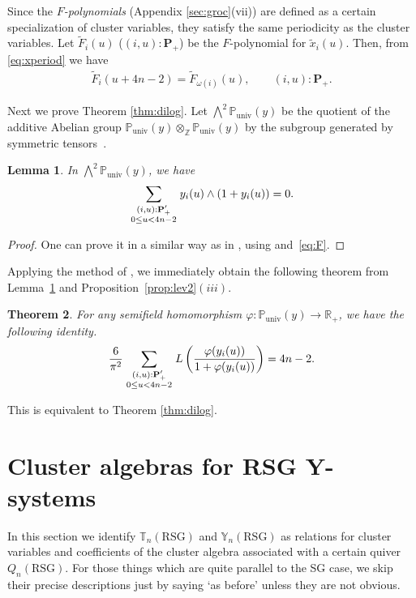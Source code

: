 \documentclass[pdftex]{sigma}
\numberwithin{equation}{section}
\newtheorem{Theorem}{Theorem}[section]
\newtheorem{Lemma}[Theorem]{Lemma}
\theoremstyle{definition}
\begin{document}
Since the {\em $F$-polynomials\/}
(Appendix \ref{sec:groc}(vii))
are def\/ined as a certain specialization of cluster variables,
they satisfy the same periodicity as the cluster variables.
Let $\tilde{F}_i(u)$ ($(i,u):\mathbf{P}_+$) be the $F$-polynomial
for $\tilde{x}_i(u)$.
Then, from \eqref{eq:xperiod} we have
\begin{gather}
\label{eq:F}
\tilde{F}_i(u+4n-2)=\tilde{F}_{\omega(i)}(u),
\qquad (i,u):\mathbf{P}_+.
\end{gather}

Next we prove
Theorem \ref{thm:dilog}.
Let $\bigwedge^2 \mathbb{P}_{\mathrm{univ}}(y)$
be the quotient of
the additive Abelian  group
$\mathbb{P}_{\mathrm{univ}}(y)\otimes_{\mathbb{Z}}
\mathbb{P}_{\mathrm{univ}}(y)$
by the subgroup generated by
symmetric tensors~\cite{Frenkel95,Chapoton05}.
\begin{Lemma}
\label{lem:dilog}
In $\bigwedge^2 \mathbb{P}_{\mathrm{univ}}(y)$, we have
\[
\sum_{
\genfrac{}{}{0pt}{1}
{
(i,u):\mathbf{P}'_+
}
{
0\leq u < 4n-2
}
} y_i(u)\wedge (1+y_i(u))=0.
\]
\end{Lemma}
\begin{proof}
One can prove it in a similar way as in \cite{Nakanishi09,Inoue10a},
using \cite[Proposition 3.13]{Fomin07} and~\eqref{eq:F}.$\!\!\!\!\!$
\end{proof}

Applying the method of \cite{Frenkel95,Chapoton05,Nakanishi09},
we immediately obtain the following theorem from
Lemma~\ref{lem:dilog} and Proposition~\ref{prop:lev2}$(iii)$.

\begin{Theorem}
For any semifield homomorphism $\varphi:\mathbb{P}_{\mathrm{univ}}(y)
\rightarrow \mathbb{R}_+$, we have the following identity.
\begin{gather*}
\frac{6}{\pi^2}
\sum_{
\genfrac{}{}{0pt}{1}
{
(i,u):\mathbf{P}'_+
}
{
0\leq u < 4n-2
}
}
L\left(
\frac{\varphi(y_i(u))}{1+\varphi(y_i(u))}
\right)
 =4n-2.
\end{gather*}
\end{Theorem}
This is equivalent to Theorem \ref{thm:dilog}.

\section{Cluster algebras for RSG Y-systems}
\label{sec:clusterRSG}

In this section we identify $\mathbb{T}_{n}(\mathrm{RSG})$ and
$\mathbb{Y}_{n}(\mathrm{RSG})$ as relations for cluster variables
and coef\/f\/i\-cients of the cluster algebra
associated with a certain quiver $Q_{n}(\mathrm{RSG})$.
For those  things which are quite parallel to the SG case,
we skip their precise descriptions just by saying `as before'
unless they are not obvious.
\end{document}
